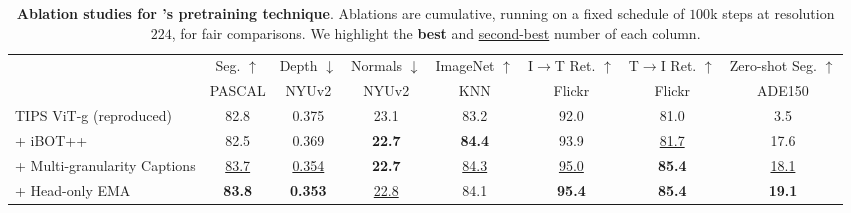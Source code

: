 \begin{table}[t]
\caption{\small\textbf{Ablation studies for \tipsvtwo's pretraining technique}. Ablations are cumulative, running on a fixed schedule of $100$k steps at resolution $224$, for fair comparisons. We highlight the \textbf{best} and \underline{second-best} number of each column.}
\vspace{-2mm}
\scriptsize
\addtolength{\tabcolsep}{0.2em}
\centering
{
\begin{tabular}{l c c c c c c c}
\small \multirow{2}{*}{Model} & Seg. $\uparrow$ & Depth $\downarrow$ & Normals $\downarrow$ & ImageNet $\uparrow$ & I$\rightarrow$T Ret. $\uparrow$ & T$\rightarrow$I Ret. $\uparrow$ & Zero-shot Seg. $\uparrow$ \\
& PASCAL & NYUv2 & NYUv2 & KNN & Flickr & Flickr & ADE150 \\
\midrule
TIPS ViT-g (reproduced)& 82.8 & 0.375 & 23.1 & 83.2 & 92.0 & 81.0 & 3.5 \\
+ iBOT++ & 82.5 & 0.369 & \textbf{22.7} & \textbf{84.4} & 93.9 & \underline{81.7} & 17.6 \\
+ Multi-granularity Captions & \underline{83.7} & \underline{0.354} & \textbf{22.7} & \underline{84.3} & \underline{95.0} & \textbf{85.4} & \underline{18.1} \\
+ Head-only EMA & \textbf{83.8} & \textbf{0.353} & \underline{22.8} & 84.1 & \textbf{95.4} & \textbf{85.4} & \textbf{19.1} \\
\end{tabular}
}
\label{tab:ablation_studies}
\end{table}

